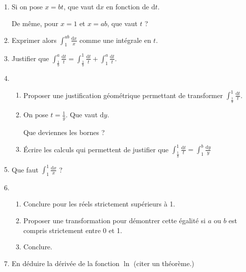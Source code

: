 \documentclass[12pt,a4paper,french]{article}
\theoremstyle{break}
\theoremstyle{break}
\theoremstyle{nonumberplain}
\begin{document}
\begin{enumerate}[resume]
  \item Si on pose $x = bt$, que vaut $\mathrm{d}x$ en fonction de
    $\mathrm{d}t$.

    De même, pour $x = 1$ et $x = ab$, que vaut $t$ ?
  \item Exprimer alors $\int_1^{ab} \frac{\mathrm{d}x}x$ comme une
    intégrale en $t$.
  \item Justifier que $\int_{\frac1b}^a \frac{\mathrm{d}t}t =
    \int_{\frac1b}^1 \frac{\mathrm{d}t}t + \int_1^a
    \frac{\mathrm{d}t}t$.
  \item \begin{enumerate}
      \item Proposer une justification géométrique permettant de
        transformer $\int_{\frac1b}^1 \frac{\mathrm{d}t}t$.
      \item On pose $t = \frac1y$. Que vaut $\mathrm{d}y$.

        Que deviennes les bornes ?
      \item Écrire les calculs qui permettent de justifier que
        $\int_{\frac1b}^1 \frac{\mathrm{d}t}t = \int_1^b
        \frac{\mathrm{d}y}y $
    \end{enumerate}
  \item Que faut $\int_1^1 \frac{\mathrm{d}x}x$ ?
  \item \begin{enumerate}
      \item Conclure pour les réels strictement supérieurs à 1.
      \item Proposer une transformation pour démontrer cette égalité si
        $a$ ou $b$ est compris strictement entre 0 et 1.
      \item Conclure.
    \end{enumerate}
  \item En déduire la dérivée de la fonction $\ln$ (citer un théorème.)
\end{enumerate}
\end{document}
